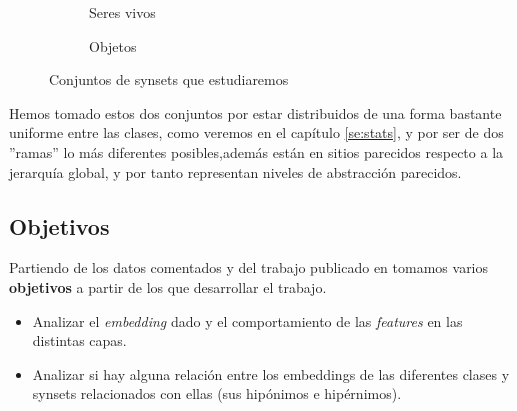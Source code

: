 \documentclass[12,twoside]{TFG-GM}
\theoremstyle{definition}
\theoremstyle{remark}
\begin{document}
\begin{figure}[H]
\centering
\begin{subfigure}{.5\textwidth}
  \centering
  \caption{Seres vivos}
  \label{fig:sub1}
\end{subfigure}%
\begin{subfigure}{.5\textwidth}
  \centering
  \caption{Objetos}
  \label{fig:sub2}
\end{subfigure}
\caption{Conjuntos de synsets que estudiaremos \label{fig:synsets}}

\end{figure}

Hemos tomado estos dos conjuntos por estar distribuidos de una forma bastante uniforme entre las clases, como veremos en el capítulo \ref{se:stats}, y por ser de dos ''ramas'' lo más diferentes posibles,además están en sitios parecidos respecto a la jerarquía global, y por tanto representan niveles de abstracción parecidos. 

 
\subsection{Objetivos}
Partiendo de los datos comentados y del trabajo publicado en \cite{fne} tomamos varios \textbf{objetivos} a partir de los que desarrollar el trabajo.

\begin{itemize}
\item Analizar el \textit{embedding} dado y el comportamiento de las \textit{features} en las distintas capas. 
\item Analizar si hay alguna relación entre los embeddings de las diferentes clases y synsets relacionados con ellas (sus hipónimos e hipérnimos). 
\end{itemize}
\end{document}
